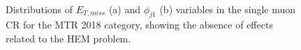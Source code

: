 \begin{figure}[htbp]
  \centering
    \\
  \caption{Distributions of $E_{T,miss}$ (a) and $\phi_{j1}$ (b) variables in the single muon CR for the MTR 2018 category, showing the absence of effects related to the HEM problem. }
  \label{app:Wmunu_noHEM}
\end{figure}




